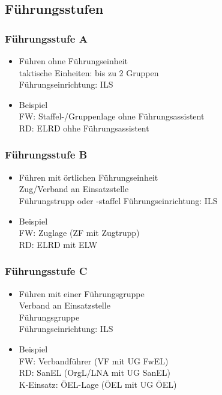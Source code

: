 \subsection{Führungsstufen}
\begin{normbox}{\subsubsection{Führungsstufe A}}
    \begin{itemize}
        \item Führen ohne Führungseinheit\\
        \ra taktische Einheiten: bis zu 2 Gruppen\\
        \ra Führungseinrichtung: ILS
        \item Beispiel\\
        \ra FW: Staffel-/Gruppenlage ohne Führungsassistent\\
        \ra RD: ELRD ohhe Führungsassistent
    \end{itemize}
\end{normbox}
\begin{normbox}{\subsubsection{Führungsstufe B}}
    \begin{itemize}
        \item Führen mit örtlichen Führungseinheit\\
        \ra Zug/Verband an Einsatzstelle\\
        \ra Führungstrupp oder -staffel
        \ra Führungseinrichtung: ILS
        \item Beispiel\\
        \ra FW: Zuglage (ZF mit Zugtrupp)\\
        \ra RD: ELRD mit ELW
    \end{itemize}
\end{normbox}
\begin{normbox}{\subsubsection{Führungsstufe C}}
    \begin{itemize}
        \item Führen mit einer Führungsgruppe\\
        \ra Verband an Einsatzstelle\\
        \ra Führungsgruppe\\
        \ra Führungseinrichtung: ILS
        \item Beispiel\\
        \ra FW: Verbandführer (VF mit UG FwEL)\\
        \ra RD: SanEL (OrgL/LNA mit UG SanEL)\\
        \ra K-Einsatz: ÖEL-Lage (ÖEL mit UG ÖEL)
    \end{itemize}
\end{normbox}
